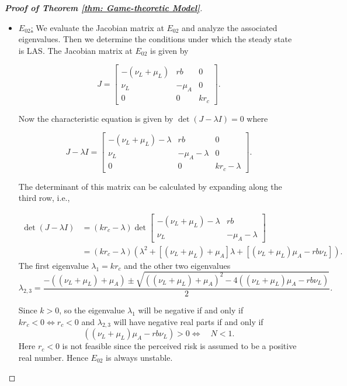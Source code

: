 \documentclass{article}
\theoremstyle{remark}
\theoremstyle{custom} %
\begin{document}
\begin{proof}[\textbf{Proof of Theorem \ref{thm: Game-theoretic Model}}]
\begin{itemize}
 \item \underline{$E_{02}$:}  We evaluate the Jacobian matrix at $E_{02}$ and analyze the associated eigenvalues. Then we determine the conditions under which the steady state is LAS. The Jacobian matrix at $E_{02}$ is given by


\[
J = \begin{bmatrix}
-(\nu_L + \mu_L) & r b & 0 \\
\nu_L & -\mu_A & 0 \\
0 & 0 & k r_c
\end{bmatrix}.
\]

Now the characteristic equation is given by \(\det(J - \lambda I) = 0\) where 

\[
J - \lambda I = \begin{bmatrix}
-(\nu_L + \mu_L) - \lambda & r b & 0 \\
\nu_L & -\mu_A - \lambda & 0 \\
0 & 0 & k r_c - \lambda
\end{bmatrix}.
\]

The determinant of this matrix can be calculated by expanding along the third row, i.e., 

$$
\begin{aligned}
\operatorname{det}(J-\lambda I) & =\left(k r_c-\lambda\right) \operatorname{det}\left[\begin{array}{cc}
-\left(\nu_L+\mu_L\right)-\lambda & r b \\
\nu_L & -\mu_A-\lambda
\end{array}\right] \\
& =\left(k r_c-\lambda\right)\left(\lambda^2+\left[\left(\nu_L+\mu_L\right)+\mu_A\right] \lambda+\left[\left(\nu_L+\mu_L\right) \mu_A-r b \nu_L\right]\right).
\end{aligned}
$$
The first eigenvalue \(\lambda_1 = k r_c\) and the other two eigenvalues 
$$
\lambda_{2,3} = \frac{-\left((\nu_L + \mu_L) + \mu_A\right) \pm \sqrt{\left((\nu_L + \mu_L) + \mu_A\right)^2 - 4\left((\nu_L + \mu_L) \mu_A - r b \nu_L\right)}}{2}.$$
 
Since $k>0$, so the eigenvalue \(\lambda_1\) will be negative if and only if \(k r_c < 0 \Leftrightarrow  r_c < 0
\) and \(\lambda_{2,3}\) will have negative real parts if and only if $$
\left(\left(\nu_L+\mu_L\right) \mu_A-r b \nu_L\right)>0 
 \Leftrightarrow \quad {N}<1.
$$
Here $r_c < 0$ is not feasible since the perceived risk is assumed to be a positive real number. Hence $E_{02}$ is always unstable.





\end{itemize}
\end{proof}
\end{document}
